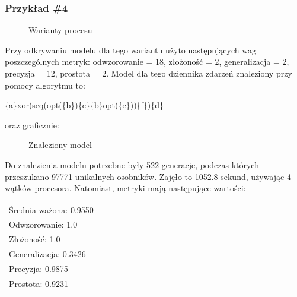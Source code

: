 \subsubsection{Przykład \#4}
\begin{figure}[!ht]
	\caption{\label{fig:flow_chart}Warianty procesu}
\end{figure}

Przy odkrywaniu modelu dla tego wariantu użyto następujących wag poszczególnych metryk: odwzorowanie = 18, złożoność = 2, generalizacja = 2, precyzja = 12, prostota = 2. Model dla tego dziennika zdarzeń znaleziony przy pomocy algorytmu to:
\begin{center}
	\{a\}xor(seq(opt(\{b\})\{c\}\{b\}opt(\{e\}))\{f\})\{d\}
\end{center}
oraz graficznie:

\begin{figure}[!ht]
	\caption{\label{fig:flow_chart}Znaleziony model}
\end{figure}

Do znalezienia modelu potrzebne były 522 generacje, podczas których przeszukano 97771 unikalnych osobników. Zajęło to 1052.8 sekund, używając 4 wątków procesora. Natomiast, metryki mają następujące wartości: 

 \begin{center}
  \begin{tabular}{l}
	Średnia ważona: 0.9550 \\
	Odwzorowanie: 1.0 \\
	Złożoność: 1.0 \\
	Generalizacja: 0.3426 \\
	Precyzja: 0.9875 \\
	Prostota: 0.9231
  \end{tabular}
 \end{center}
 
